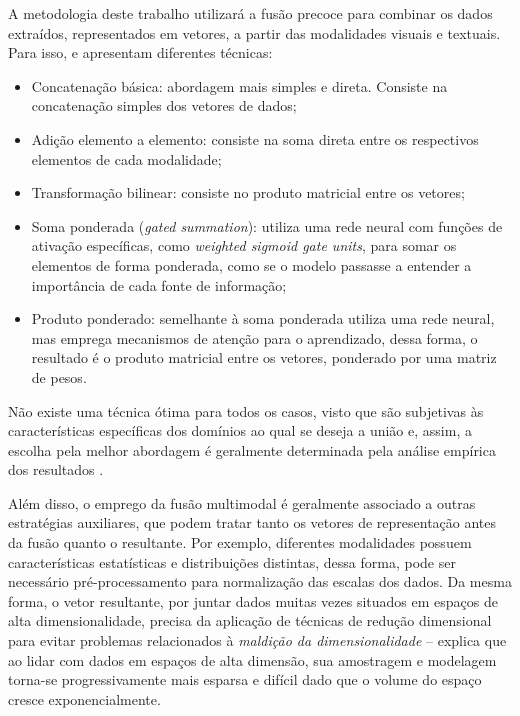 A metodologia deste trabalho utilizará a fusão precoce para combinar os dados extraídos, representados em vetores, a partir das modalidades visuais e textuais. Para isso, \citeauthor*{multimodalmeta} \cite*{multimodalmeta} e \citeauthor*{multimodalforgery} \cite*{multimodalforgery} apresentam diferentes técnicas:

\begin{itemize}
	\item Concatenação básica: abordagem mais simples e direta. Consiste na concatenação simples dos vetores de dados;
	\item Adição elemento a elemento: consiste na soma direta entre os respectivos elementos de cada modalidade;
	\item Transformação bilinear: consiste no produto matricial entre os vetores;
	\item Soma ponderada (\textit{gated summation}): utiliza uma rede neural com funções de ativação específicas, como \textit{weighted sigmoid gate units}, para somar os elementos de forma ponderada, como se o modelo passasse a entender a importância de cada fonte de informação;
	\item Produto ponderado: semelhante à soma ponderada utiliza uma rede neural, mas emprega mecanismos de atenção para o aprendizado, dessa forma, o resultado é o produto matricial entre os vetores, ponderado por uma matriz de pesos.
\end{itemize}

Não existe uma técnica ótima para todos os casos, visto que são subjetivas às características específicas dos domínios ao qual se deseja a união e, assim, a escolha pela melhor abordagem é geralmente determinada pela análise empírica dos resultados \cite{multimodalmeta}.

Além disso, o emprego da fusão multimodal é geralmente associado a outras estratégias auxiliares, que podem tratar tanto os vetores de representação antes da fusão quanto o resultante. Por exemplo, diferentes modalidades possuem características estatísticas e distribuições distintas, dessa forma, pode ser necessário pré-processamento para normalização das escalas dos dados. Da mesma forma, o vetor resultante, por juntar dados muitas vezes situados em espaços de alta dimensionalidade, precisa da aplicação de técnicas de redução dimensional para evitar problemas relacionados à \textit{maldição da dimensionalidade} -- \citeauthor*{bellmancurse} \cite*{bellmancurse} explica que ao lidar com dados em espaços de alta dimensão, sua amostragem e modelagem torna-se progressivamente mais esparsa e difícil dado que o volume do espaço cresce exponencialmente.

